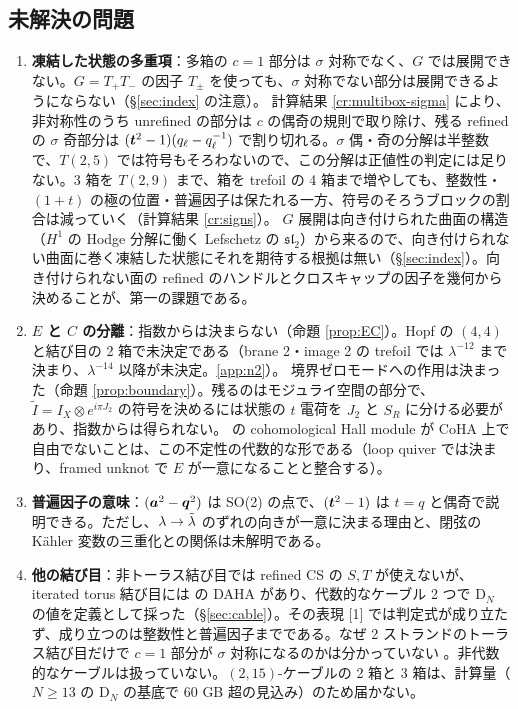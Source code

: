 \subsection{未解決の問題}
\begin{enumerate}
\item \textbf{凍結した状態の多重項}：多箱の $c = 1$ 部分は $\sigma$ 対称でなく、$G$ では展開できない。$G = T_+T_-$ の因子 $T_\pm$ を使っても、$\sigma$ 対称でない部分は展開できるようにならない（§\ref{sec:index} の注意）。
計算結果 \ref{cr:multibox-sigma} により、非対称性のうち unrefined の部分は $c$ の偶奇の規則で取り除け、残る refined の $\sigma$ 奇部分は $(\bm{t}^2-1)(q_\ell - q_\ell^{-1})$ で割り切れる。$\sigma$ 偶・奇の分解は半整数で、$T(2,5)$ では符号もそろわないので、この分解は正値性の判定には足りない。3 箱を $T(2,9)$ まで、箱を trefoil の 4 箱まで増やしても、整数性・$(1+t)$ の極の位置・普遍因子は保たれる一方、符号のそろうブロックの割合は減っていく（計算結果 \ref{cr:signs}）。
$G$ 展開は向き付けられた曲面の構造（$H^1$ の Hodge 分解に働く Lefschetz の $\mathfrak{sl}_2$）から来るので、向き付けられない曲面に巻く凍結した状態にそれを期待する根拠は無い（§\ref{sec:index}）。向き付けられない面の refined のハンドルとクロスキャップの因子を幾何から決めることが、第一の課題である。
\item \textbf{$E$ と $C$ の分離}：指数からは決まらない（命題 \ref{prop:EC}）。Hopf の $(4,4)$ と結び目の 2 箱で未決定である（brane 2・image 2 の trefoil では $\lambda^{-12}$ まで決まり、$\lambda^{-14}$ 以降が未決定。\ref{app:n2}）。
境界ゼロモードへの作用は決まった（命題 \ref{prop:boundary}）。残るのはモジュライ空間の部分で、$\tilde I = I_X\otimes e^{i\pi J_2}$ の符号を決めるには状態の $t$ 電荷を $J_2$ と $S_R$ に分ける必要があり、指数からは得られない。\cite{Young16} の cohomological Hall module が CoHA 上で自由でないことは、この不定性の代数的な形である（loop quiver では決まり、framed unknot で $E$ が一意になることと整合する）。
\item \textbf{普遍因子の意味}：$(\bm{a}^2 - \bm{q}^2)$ は SO(2) の点で、$(\bm{t}^2 - 1)$ は $t = q$ と偶奇で説明できる。ただし、$\lambda \to \tilde\lambda$ のずれの向きが一意に決まる理由と、閉弦の Kähler 変数の三重化との関係は未解明である。
\item \textbf{他の結び目}：非トーラス結び目では refined CS の $S, T$ が使えないが、iterated torus 結び目には \cite{CD14} の DAHA があり、代数的なケーブル 2 つで D$_N$ の値を定義として採った（§\ref{sec:cable}）。その表現 [1] では判定式が成り立たず、成り立つのは整数性と普遍因子までである。なぜ 2 ストランドのトーラス結び目だけで $c = 1$ 部分が $\sigma$ 対称になるのかは分かっていない \open。非代数的なケーブルは扱っていない。$(2,15)$-ケーブルの 2 箱と 3 箱は、計算量（$N \ge 13$ の D$_N$ の基底で 60 GB 超の見込み）のため届かない。

\end{enumerate}
